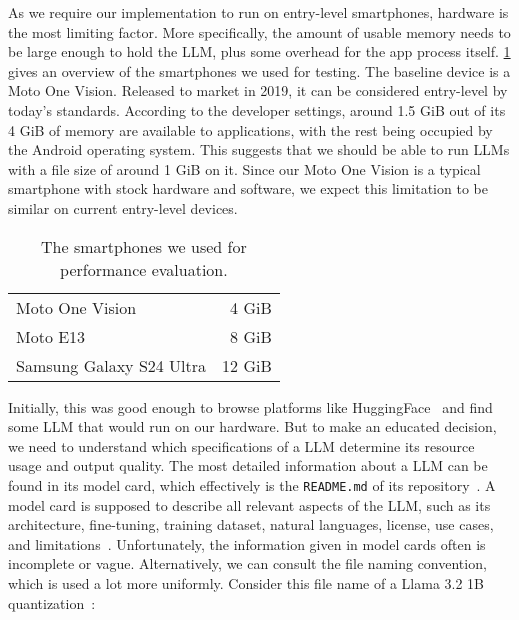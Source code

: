 As we require our implementation to run on entry-level smartphones, hardware is the most limiting factor. More specifically, the amount of usable memory needs to be large enough to hold the \gls{LLM}, plus some overhead for the app process itself. \cref{tab:smartphones} gives an overview of the smartphones we used for testing. The baseline device is a Moto One Vision. Released to market in 2019, it can be considered entry-level by today's standards. According to the developer settings, around 1.5 GiB out of its 4 GiB of memory are available to applications, with the rest being occupied by the Android operating system. This suggests that we should be able to run \glspl{LLM} with a file size of around 1 GiB on it. Since our Moto One Vision is a typical smartphone with stock hardware and software, we expect this limitation to be similar on current entry-level devices.

\begin{table}
	\centering
	\begin{tabular}{@{} lr @{}} %
		\toprule
		\tableheadline{Smartphone} & \tableheadline{Memory} \\
		\midrule
		Moto One Vision          &  4 GiB \\
		Moto E13                 &  8 GiB \\
		Samsung Galaxy S24 Ultra & 12 GiB \\
		\bottomrule
	\end{tabular}
	\caption[Smartphones]{The smartphones we used for performance evaluation.}
	\label{tab:smartphones}
\end{table}

Initially, this was good enough to browse platforms like HuggingFace~\cite{huggingfaceModelsHuggingFace2025} and find some \gls{LLM} that would run on our hardware. But to make an educated decision, we need to understand which specifications of a \gls{LLM} determine its resource usage and output quality. The most detailed information about a \gls{LLM} can be found in its model card, which effectively is the \lstinline|README.md| of its repository~\cite{mitchellModelCardsModel2019,huggingfaceModelCards}. A model card is supposed to describe all relevant aspects of the \gls{LLM}, such as its architecture, fine-tuning, training dataset, natural languages, license, use cases, and limitations~\cite{mitchellModelCardsModel2019,huggingfaceModelCards}. Unfortunately, the information given in model cards often is incomplete or vague. Alternatively, we can consult the file naming convention, which is used a lot more uniformly. Consider this file name of a Llama 3.2 1B quantization~\cite{huggingquantsHuggingquantsLlama321BInstructQ4_K_MGGUFHugging2024}:

